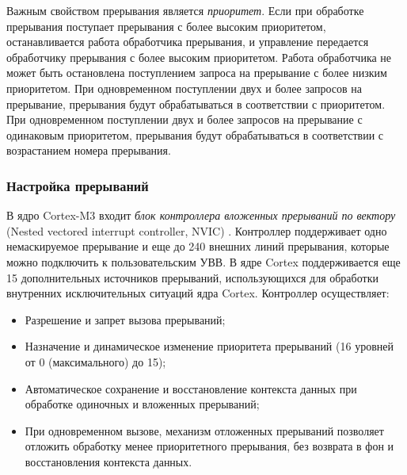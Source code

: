 Важным свойством прерывания является \textit{приоритет}. Если при обработке прерывания поступает прерывания с более высоким приоритетом, останавливается работа обработчика прерывания, и управление передается обработчику прерывания с более высоким приоритетом. Работа обработчика не может быть остановлена поступлением запроса на прерывание с более низким приоритетом. При одновременном поступлении двух и более запросов на прерывание, прерывания будут обрабатываться в соответствии с приоритетом. При одновременном поступлении двух и более запросов на прерывание с одинаковым приоритетом, прерывания будут обрабатываться в соответствии с возрастанием номера прерывания.
\subsubsection{Настройка прерываний}

В ядро Cortex-M3 входит \textit{блок контроллера вложенных прерываний по вектору} (Nested vectored interrupt controller, NVIC) \cite{arm} \cite{cortex}. Контроллер поддерживает одно немаскируемое прерывание и еще до 240 внешних линий прерывания, которые можно подключить к пользовательским УВВ. В ядре Cortex поддерживается еще 15 дополнительных источников прерываний, использующихся для обработки внутренних исключительных ситуаций ядра Cortex. Контроллер осуществляет:
\begin{itemize}
\item Разрешение и запрет вызова прерываний;
\item Назначение и динамическое изменение приоритета прерываний (16 уровней от 0 (максимального) до 15);
\item Автоматическое сохранение и восстановление контекста данных при обработке одиночных и вложенных прерываний;
\item При одновременном вызове, механизм отложенных прерываний позволяет отложить обработку менее приоритетного прерывания, без возврата в фон и восстановления контекста данных.
\end{itemize}

